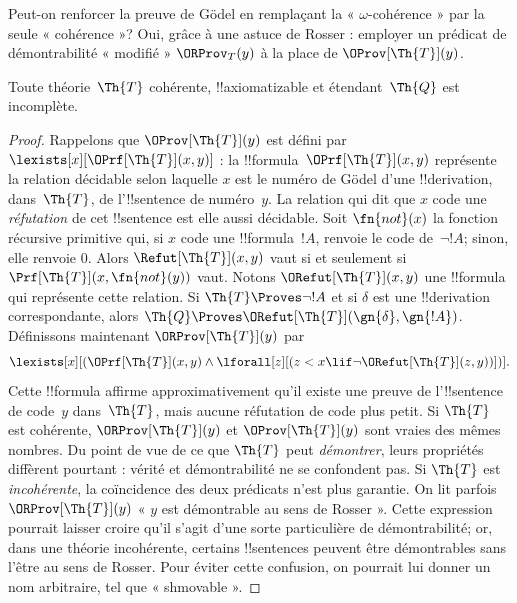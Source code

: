 \documentclass[../../../include/open-logic-section]{subfiles}
\begin{document}


Peut-on renforcer la preuve de Gödel en remplaçant
la « $\omega$-cohérence » par la seule « cohérence »?
Oui, grâce à une astuce de Rosser : employer un
prédicat de démontrabilité « modifié »
$\ORProv_T(y)$ à la place de
$\OProv[\Th{T}](y)$.

\begin{thm}
Toute théorie~$\Th{T}$ cohérente,
!!{axiomatizable} et étendant~$\Th{Q}$ est
incomplète.
\end{thm}

\begin{proof}
Rappelons que $\OProv[\Th{T}](y)$ est défini par
$\lexists[x][\OPrf[\Th{T}](x,y)]$ : la
!!{formula}~$\OPrf[\Th{T}](x,y)$ représente la
relation décidable selon laquelle $x$ est le numéro
de Gödel d'une !!{derivation}, dans~$\Th{T}$,
de l'!!{sentence} de numéro~$y$.
La relation qui dit que $x$ code une
\emph{réfutation} de cet !!{sentence} est elle
aussi décidable. Soit $\fn{not}(x)$ la fonction
récursive primitive qui, si $x$ code une
!!{formula}~$!A$, renvoie le code de~$\lnot !A$; sinon, elle renvoie $0$.
Alors $\Refut[\Th{T}](x,y)$ vaut si et seulement
si $\Prf[\Th{T}](x,\fn{not}(y))$ vaut.
Notons $\ORefut[\Th{T}](x,y)$ une !!{formula}
qui représente cette relation. Si
$\Th{T}\Proves\lnot !A$ et si $\delta$ est une
!!{derivation} correspondante, alors
$\Th{Q}\Proves\ORefut[\Th{T}](\gn{\delta},\gn{!A})$.
Définissons maintenant $\ORProv[\Th{T}](y)$ par
\[
\lexists[x][(\OPrf[\Th{T}](x,y)\land
\lforall[z][(z<x\lif\lnot\ORefut[\Th{T}](z,y))])].
\]
Cette !!{formula} affirme approximativement qu'il
existe une preuve de l'!!{sentence} de code~$y$
dans~$\Th{T}$, mais aucune réfutation de code
plus petit. Si $\Th{T}$ est cohérente,
$\ORProv[\Th{T}](y)$ et $\OProv[\Th{T}](y)$
sont vraies des mêmes nombres. Du point de vue de
ce que $\Th{T}$ peut \emph{démontrer}, leurs
propriétés diffèrent pourtant : vérité et
démontrabilité ne se confondent pas. Si $\Th{T}$
est \emph{incohérente}, la coïncidence des deux
prédicats n'est plus garantie. On lit parfois
$\ORProv[\Th{T}](y)$ « $y$ est démontrable au
sens de Rosser ». Cette expression pourrait laisser
croire qu'il s'agit d'une sorte particulière de
démontrabilité; or, dans une théorie incohérente,
certains !!{sentence}s peuvent être démontrables sans
l'être au sens de Rosser. Pour éviter cette
confusion, on pourrait lui donner un nom
arbitraire, tel que « shmovable ».


\end{proof}
\end{document}
